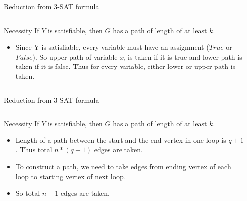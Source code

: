\begin{frame}{Reduction from 3-SAT formula}
\begin{columns}
\begin{column}{0.45\textwidth}
\begin{block}{Necessity}
If $Y$ is satisfiable, then $G$ has a path of length of at least $k$.
\end{block}


  \begin{itemize} 
        \item<1-> Since Y is satisfiable, every variable must have an assignment ($True$ or $False$). So upper path of variable $x_i$ is taken if it is true and lower path is taken if it is false. Thus for every variable, either lower or upper path is taken.
        
\end{itemize}
\end{column}
\begin{column}{0.55\textwidth}
    \begin{overlayarea}{0.55\textwidth}{8cm}
    \end{overlayarea}
\end{column}
\end{columns}
\end{frame}

\begin{frame}{Reduction from 3-SAT formula}
\begin{columns}
\begin{column}{0.45\textwidth}
\begin{block}{Necessity}
If $Y$ is satisfiable, then $G$ has a path of length of at least $k$.
\end{block}

  \begin{itemize} 
    \item<1->Length of a path between the start and the end vertex in one loop is $q+1$. Thus total $n*(q+1)$ edges are taken.
    \item<2-> To construct a path, we need to take edges from ending vertex of each loop to starting vertex of next loop. 
    \item<3->So total $n-1$ edges are taken.

\end{itemize}
\end{column}
\begin{column}{0.55\textwidth}
    \begin{overlayarea}{0.55\textwidth}{8cm}
        \only<1>{}
    \end{overlayarea}
\end{column}
\end{columns}
\end{frame}

